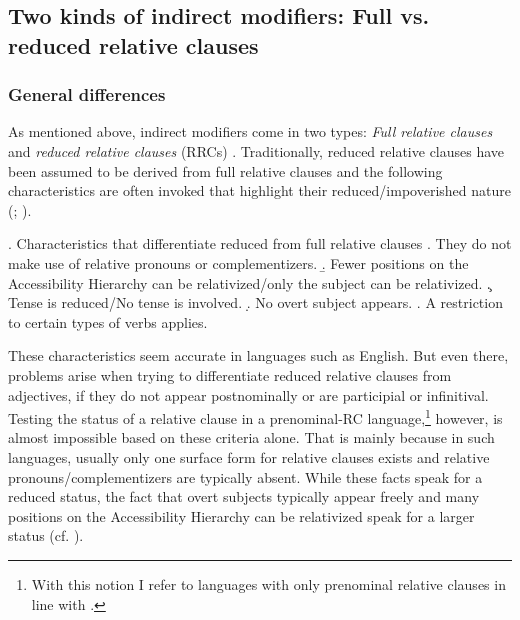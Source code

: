 \subsection{Two kinds of indirect modifiers: Full vs. reduced relative clauses} \label{chapter RC}

\subsubsection{General differences}

As mentioned above, indirect modifiers come in two types: \textit{Full relative clauses} and \textit{reduced relative clauses} (RRCs) \citep{cinque:2010:adj, cinque:2020:relcl, krause:2001:rrc, douglas:2016:syntactic, harwood:2018:rrc}. Traditionally, reduced relative clauses have been assumed to be derived from full relative clauses \citep{smith:1964:det} and the following characteristics are often invoked that highlight their reduced/impoverished nature (\citealt[203]{cinque:2020:relcl}; \citealt{bhatt:1999:covert, krause:2001:rrc, douglas:2016:syntactic, harwood:2018:rrc}).

\ex. Characteristics that differentiate reduced from full relative clauses \label{chara rrc}
\a. They do not make use of relative pronouns or complementizers.
\b. Fewer positions on the Accessibility Hierarchy \citep{keenan:1977:noun} can be relativized/only the subject can be relativized.
\c. Tense is reduced/No tense is involved.
\d. No overt subject appears.
\e. A restriction to certain types of verbs applies.

These characteristics seem accurate in languages such as  English. But even there, problems arise when trying to differentiate reduced relative clauses from adjectives, if they do not appear postnominally or are participial or infinitival. Testing the status of a relative clause in a prenominal-RC language,\footnote{With this notion I refer to languages with only prenominal relative clauses in line with \citet{wu:2011:syntax}.} however, is almost impossible based on these criteria alone. That is mainly because in such languages, usually only one surface form for relative clauses exists and relative pronouns/complementizers are typically absent. While these facts speak for a reduced status, the fact that overt subjects typically appear freely and many positions on the Accessibility Hierarchy can be relativized speak for a larger status (cf. \citealt{wu:2011:syntax}).

